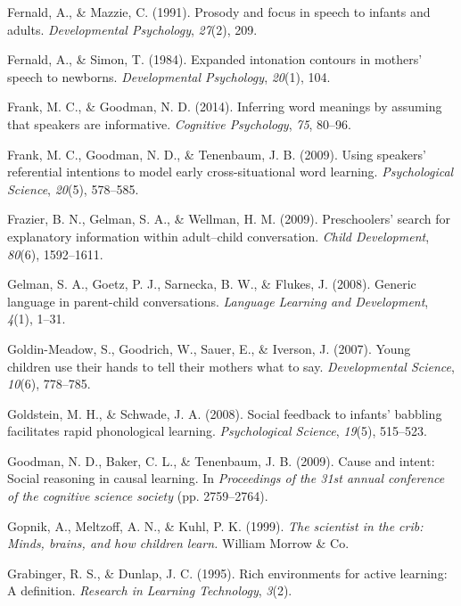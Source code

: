\documentclass[a4paper,man,apacite,floatsintext]{apa6}
\begin{document}
\hypertarget{ref-fernald1991prosody}{}
Fernald, A., \& Mazzie, C. (1991). Prosody and focus in speech to
infants and adults. \emph{Developmental Psychology}, \emph{27}(2), 209.

\hypertarget{ref-fernald1984expanded}{}
Fernald, A., \& Simon, T. (1984). Expanded intonation contours in
mothers' speech to newborns. \emph{Developmental Psychology},
\emph{20}(1), 104.

\hypertarget{ref-frank2014inferring}{}
Frank, M. C., \& Goodman, N. D. (2014). Inferring word meanings by
assuming that speakers are informative. \emph{Cognitive Psychology},
\emph{75}, 80--96.

\hypertarget{ref-frank2009using}{}
Frank, M. C., Goodman, N. D., \& Tenenbaum, J. B. (2009). Using
speakers' referential intentions to model early cross-situational word
learning. \emph{Psychological Science}, \emph{20}(5), 578--585.

\hypertarget{ref-frazier2009preschoolers}{}
Frazier, B. N., Gelman, S. A., \& Wellman, H. M. (2009). Preschoolers'
search for explanatory information within adult--child conversation.
\emph{Child Development}, \emph{80}(6), 1592--1611.

\hypertarget{ref-gelman2008generic}{}
Gelman, S. A., Goetz, P. J., Sarnecka, B. W., \& Flukes, J. (2008).
Generic language in parent-child conversations. \emph{Language Learning
and Development}, \emph{4}(1), 1--31.

\hypertarget{ref-goldin2007young}{}
Goldin-Meadow, S., Goodrich, W., Sauer, E., \& Iverson, J. (2007). Young
children use their hands to tell their mothers what to say.
\emph{Developmental Science}, \emph{10}(6), 778--785.

\hypertarget{ref-goldstein2008social}{}
Goldstein, M. H., \& Schwade, J. A. (2008). Social feedback to infants'
babbling facilitates rapid phonological learning. \emph{Psychological
Science}, \emph{19}(5), 515--523.

\hypertarget{ref-goodman2009cause}{}
Goodman, N. D., Baker, C. L., \& Tenenbaum, J. B. (2009). Cause and
intent: Social reasoning in causal learning. In \emph{Proceedings of the
31st annual conference of the cognitive science society} (pp.
2759--2764).

\hypertarget{ref-gopnik1999scientist}{}
Gopnik, A., Meltzoff, A. N., \& Kuhl, P. K. (1999). \emph{The scientist
in the crib: Minds, brains, and how children learn.} William Morrow \&
Co.

\hypertarget{ref-grabinger1995rich}{}
Grabinger, R. S., \& Dunlap, J. C. (1995). Rich environments for active
learning: A definition. \emph{Research in Learning Technology},
\emph{3}(2).
\end{document}
